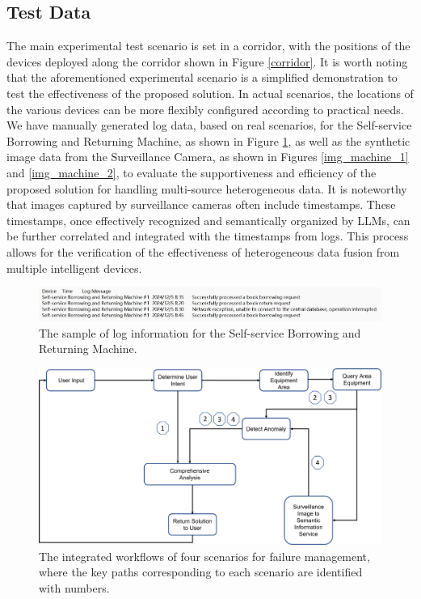 \documentclass[preprint,12pt]{elsarticle}
\begin{document}
\subsection{Test Data}
The main experimental test scenario is set in a corridor, with the positions of the devices deployed along the corridor shown in Figure \ref{corridor}. It is worth noting that the aforementioned experimental scenario is a simplified demonstration to test the effectiveness of the proposed solution. In actual scenarios, the locations of the various devices can be more flexibly configured according to practical needs. 
We have manually generated log data, based on real scenarios, for the Self-service Borrowing and Returning Machine, as shown in Figure \ref{log_machine}, as well as the synthetic image data from the Surveillance Camera, as shown in Figures \ref{img_machine_1} and \ref{img_machine_2}, to evaluate the supportiveness and efficiency of the proposed solution for handling multi-source heterogeneous data. It is noteworthy that images captured by surveillance cameras often include timestamps. These timestamps, once effectively recognized and semantically organized by LLMs, can be further correlated and integrated with the timestamps from logs. This process allows for the verification of the effectiveness of heterogeneous data fusion from multiple intelligent devices.


\begin{figure}[!h]
	\centering
	\includegraphics[width=\linewidth]{log.png}
	\caption{The sample of log information for the Self-service Borrowing and Returning Machine.}
	\label{log_machine}
\end{figure}






\begin{figure}[!h]
	\centering
	\includegraphics[width=\linewidth]{case_proc.png}
	\caption{The integrated workflows of four scenarios for failure management, where the key paths corresponding to each scenario are identified with numbers.}
	\label{case_proc}
\end{figure}
\end{document}
